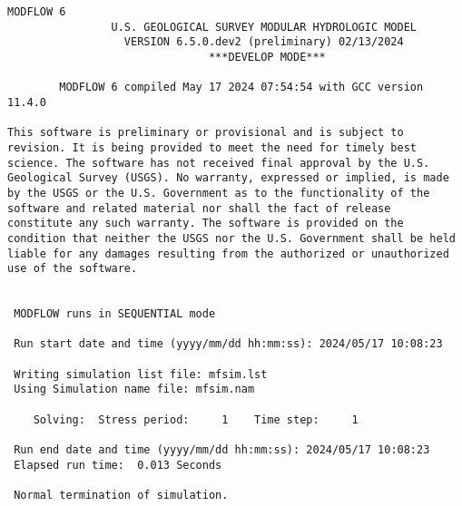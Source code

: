 {\small
\begin{lstlisting}[style=modeloutput]
                                   MODFLOW 6
                U.S. GEOLOGICAL SURVEY MODULAR HYDROLOGIC MODEL
                  VERSION 6.5.0.dev2 (preliminary) 02/13/2024
                               ***DEVELOP MODE***

        MODFLOW 6 compiled May 17 2024 07:54:54 with GCC version 11.4.0

This software is preliminary or provisional and is subject to 
revision. It is being provided to meet the need for timely best 
science. The software has not received final approval by the U.S. 
Geological Survey (USGS). No warranty, expressed or implied, is made 
by the USGS or the U.S. Government as to the functionality of the 
software and related material nor shall the fact of release 
constitute any such warranty. The software is provided on the 
condition that neither the USGS nor the U.S. Government shall be held 
liable for any damages resulting from the authorized or unauthorized 
use of the software.


 MODFLOW runs in SEQUENTIAL mode

 Run start date and time (yyyy/mm/dd hh:mm:ss): 2024/05/17 10:08:23

 Writing simulation list file: mfsim.lst
 Using Simulation name file: mfsim.nam

    Solving:  Stress period:     1    Time step:     1

 Run end date and time (yyyy/mm/dd hh:mm:ss): 2024/05/17 10:08:23
 Elapsed run time:  0.013 Seconds

 Normal termination of simulation.
\end{lstlisting}
}
